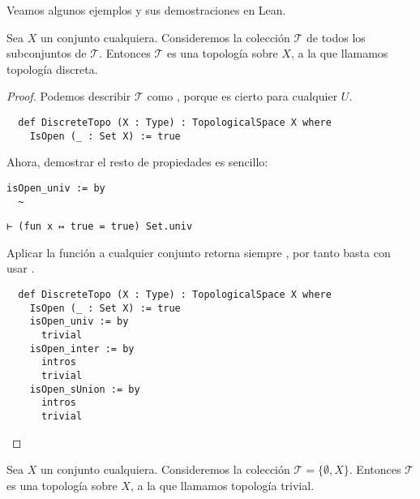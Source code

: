 Veamos algunos ejemplos y sus demostraciones en Lean.

\begin{example}
    Sea $X$ un conjunto cualquiera. Consideremos la colección $\mathcal{T}$ de todos los subconjuntos de $\mathcal{T}$. Entonces $\mathcal{T}$ es una topología sobre $X$, a la que llamamos \textnormal{topología discreta}.
\end{example}

\begin{proof}
  Podemos describir $\mathcal T$ como , porque  es cierto para cualquier $U$.

  \begin{lstlisting}
  def DiscreteTopo (X : Type) : TopologicalSpace X where
    IsOpen (_ : Set X) := true \end{lstlisting}
  
  Ahora, demostrar el resto de propiedades es sencillo:

  \begin{minipage}[t]{0.58\textwidth}
\begin{lstlisting}[language=lean]
    isOpen_univ := by
  ~
\end{lstlisting}
\end{minipage}%
\hfill
\begin{minipage}[t]{0.40\textwidth}
\begin{lstlisting}[language=infoview]
  ⊢ (fun x ↦ true = true) Set.univ
\end{lstlisting}
\end{minipage}

Aplicar la función  a cualquier conjunto retorna siempre , por tanto basta con usar .

\begin{lstlisting}
  def DiscreteTopo (X : Type) : TopologicalSpace X where
    IsOpen (_ : Set X) := true
    isOpen_univ := by
      trivial
    isOpen_inter := by
      intros
      trivial
    isOpen_sUnion := by
      intros
      trivial
\end{lstlisting}

\end{proof}


\begin{example}
    Sea $X$ un conjunto cualquiera. Consideremos la colección $\mathcal{T}=\{\emptyset, X\}$. Entonces $\mathcal{T}$ es una topología sobre $X$, a la que llamamos \textnormal{topología trivial}.
\end{example}

